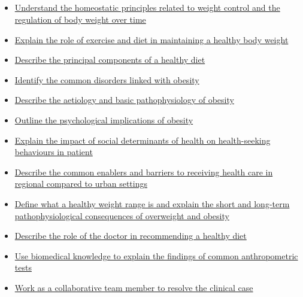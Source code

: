 \documentclass[10pt, a4paper]{article}
\newcommand{\MYhref}[3][blue]{\href{#2}{\color{#1}{#3}}}%
\begin{document}
\subsection{\MYhref[melbBlue]{https://notion.so/7a7ce80f141a4121981c9e3ce769247e}{Lynn Adamson - Overweight [Prediabetic]}} \begin{itemize} \item \href{https://www.notion.so/322266107268411b8fa97a128c624904}{Understand the homeostatic principles related to weight control and the regulation of body weight over time} \item \href{https://www.notion.so/514222ea795d4a4a94eb78df11b7b6e7}{Explain the role of exercise and diet in maintaining a healthy body weight} \item \href{https://www.notion.so/1af92eceb56544cf89842afca7f95001}{Describe the principal components of a healthy diet} \item \href{https://www.notion.so/972e20853ce44ef8a411b42badbe55e6}{Identify the common disorders linked with obesity} \item \href{https://www.notion.so/e7f9eab601704caa82cf941dddb16c61}{Describe the aetiology and basic pathophysiology of obesity} \item \href{https://www.notion.so/a8acb3fb49614aad91cc98c0456ce53b}{Outline the psychological implications of obesity} \item \href{https://www.notion.so/21832dd272a54176bda57f3c60f6beef}{Explain the impact of social determinants of health on health-seeking behaviours in patient} \item \href{https://www.notion.so/1dff3750c18a491bb39275adc9b57ffb}{Describe the common enablers and barriers to receiving health care in regional compared to urban settings} \item \href{https://www.notion.so/cc622cdde41547ceab0563c3cf7875f5}{Define what a healthy weight range is and explain the short and long-term pathophysiological consequences of overweight and obesity} \item \href{https://www.notion.so/fe5db6f846474010a940b1465ce65c08}{Describe the role of the doctor in recommending a healthy diet} \item \href{https://www.notion.so/08f066e7993b429ab48f282fdc2a9825}{Use biomedical knowledge to explain the findings of common anthropometric tests} \item \href{https://www.notion.so/27989e800cb94487aad16575156680d8}{Work as a collaborative team member to resolve the clinical case} \end{itemize}
\end{document}
